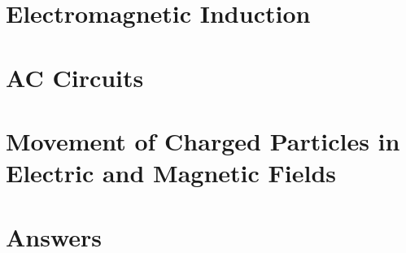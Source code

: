 \documentclass[11pt]{article}
\begin{document}
\newpage
\section{Electromagnetic Induction}


\newpage
\section{AC Circuits}


\newpage
\section{Movement of Charged Particles in Electric and Magnetic Fields}


\newpage
\section{Answers}
\end{document}
